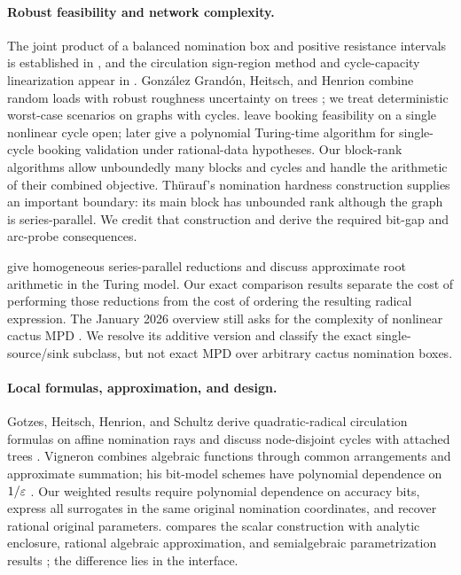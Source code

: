 \paragraph{Robust feasibility and network complexity.}
The joint product of a balanced nomination box and positive resistance
intervals is established in \citet[Section 3.3]{amann2019-exact-methods-for-two-stage},
and the circulation sign-region method and cycle-capacity linearization
appear in \citet{amann2018-deciding-robust-feasibility-and-infeasibility}.
Gonz\'alez Grand\'on, Heitsch, and Henrion combine random loads with
robust roughness uncertainty on trees \citep{gonzalez2017-joint}; we
treat deterministic worst-case scenarios on graphs with cycles.
\citet[Section 6]{labbe2020-bookings-in-the-european-gas} leave booking
feasibility on a single nonlinear cycle open;
\citet[Section 6]{labbe2021-deciding-feasibility-on-a-cycle} later give a
polynomial Turing-time algorithm for single-cycle booking validation
under rational-data hypotheses.
Our block-rank algorithms allow unboundedly many blocks and cycles and
handle the arithmetic of their combined objective.
Th\"urauf's nomination hardness construction
\citep{thurauf2022-deciding-the-feasibility-of-a} supplies an important
boundary: its main block has unbounded rank although the graph is
series-parallel. We credit that construction and derive the required
bit-gap and arc-probe consequences.

\citet[Lemma 4.2 and Theorem 4.3]{gro2017-algorithmic-results-for-potential-based}
give homogeneous series-parallel reductions and discuss approximate
root arithmetic in the Turing model. Our exact comparison results
separate the cost of performing those reductions from the cost of
ordering the resulting radical expression. The January 2026 overview
still asks for the complexity of nonlinear cactus MPD
\citep[pp.~9--10]{pfetsch2026-potential-based-flowsan-overview}. We resolve
its additive version and classify the exact single-source/sink subclass,
but not exact MPD over arbitrary cactus nomination boxes.

\paragraph{Local formulas, approximation, and design.}
Gotzes, Heitsch, Henrion, and Schultz derive quadratic-radical circulation
formulas on affine nomination rays and discuss node-disjoint cycles
with attached trees \citep[Theorem 6, pp.~18 and 24 of the author manuscript]
{gotzes2016-quantification}. Vigneron combines algebraic functions through
common arrangements and approximate summation; his bit-model schemes
have polynomial dependence on $1/\varepsilon$
\citep[Theorem 6 and Sections 2.3, 3.2]{vigneron2014-geometric-optimization-and-sums-of}.
Our weighted results require polynomial dependence on accuracy bits,
express all surrogates in the same original nomination coordinates, and
recover rational original parameters.
 compares the scalar construction with
analytic enclosure, rational algebraic approximation, and semialgebraic
parametrization results
\citep{petras2002-approximation,borcea2006-rational-algebraic,yomdin2014-parametrizations,binyamini2019-complex-cells};
the difference lies in the interface.

